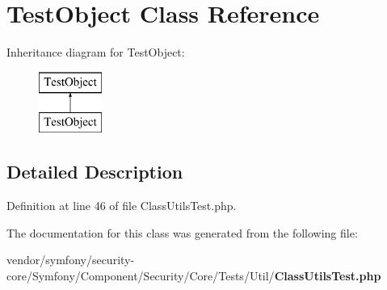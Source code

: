 \section{Test\+Object Class Reference}
\label{class_acme_1_1_demo_bundle_1_1_proxy_1_1_____c_g_____1_1_symfony_1_1_component_1_1_security_1_1_1d1989e9b1503e23c6343c06d95f657d}
Inheritance diagram for Test\+Object\+:\begin{figure}[H]
\begin{center}
\leavevmode
\includegraphics[height=2.000000cm]{class_acme_1_1_demo_bundle_1_1_proxy_1_1_____c_g_____1_1_symfony_1_1_component_1_1_security_1_1_1d1989e9b1503e23c6343c06d95f657d}
\end{center}
\end{figure}


\subsection{Detailed Description}


Definition at line 46 of file Class\+Utils\+Test.\+php.



The documentation for this class was generated from the following file\+:\begin{DoxyCompactItemize}
\item 
vendor/symfony/security-\/core/\+Symfony/\+Component/\+Security/\+Core/\+Tests/\+Util/{\bf Class\+Utils\+Test.\+php}\end{DoxyCompactItemize}
